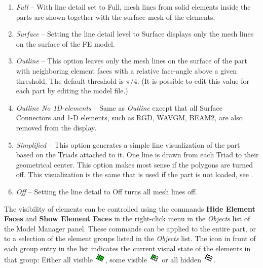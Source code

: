 \begin{enumerate}
\item{\sl Full} --
  With line detail set to Full, mesh lines from solid elements inside the parts
  are shown together with the surface mesh of the elements.
\item{\sl Surface} --
  Setting the line detail level to Surface displays only the mesh lines
  on the surface of the FE model.
\item{\sl Outline} --
  This option leaves only the mesh lines on the surface of the part with
  neighboring element faces with a relative face-angle above a given threshold.
  The default threshold is $\pi/4$. (It is possible to edit this
  value for each part by editing the model file.)
\item{\sl Outline No 1D-elements} --
  Same as {\sl Outline} except that all Surface Connectors and 1-D elements,
  such as RGD, WAVGM, BEAM2, are also removed from the display.
\item{\sl Simplified} --
  This option generates a simple line visualization of the part
  based on the Triads attached to it.
  One line is drawn from each Triad to their geometrical center.
  This option makes most sense if the polygons are turned off.
  This visualization is the same that is used if the part is not loaded,
  see .
\item{\sl Off} --
  Setting the line detail to Off turns all mesh lines off.
\end{enumerate}




The visibility of elements can be controlled using the commands
\textbf{Hide Element Faces} and \textbf{Show Element Faces} in the right-click
menu in the {\sl Objects} list of the Model Manager panel.
These commands can be applied to the entire part, or to a selection of the
element groups listed in the {\sl Objects} list.
The icon in front of each group entry in the list indicates the current visual
state of the elements in that group:
Either all visible \includegraphics[scale=0.8]{Figures/AllElementsVisible},
some visible \includegraphics[scale=0.8]{Figures/SomeElementsVisible}
or all hidden \includegraphics[scale=0.8]{Figures/AllElementsHidden}.

